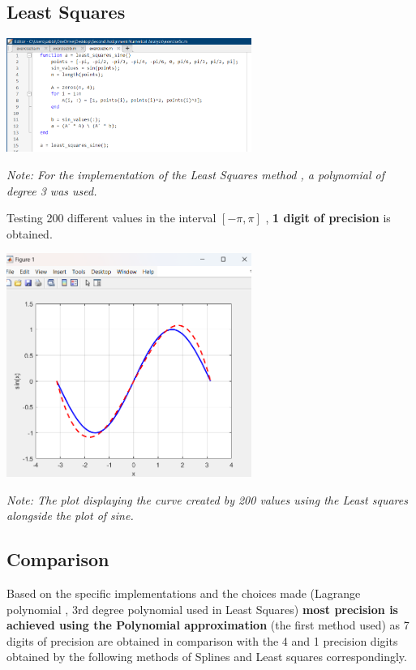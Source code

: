 \documentclass{article}
\begin{document}
\subsection{Least Squares}
\begin{tcolorbox}[colback=red!10, colframe=gray!80, width=\textwidth, sharp corners]
    \centering 
    \includegraphics[width=0.6\textwidth,height=0.19\textheight]{Exercise5cCode.png} 

    
    \vspace{0.5cm}
    \small\textit{Note: For the implementation of the Least Squares method , a polynomial of degree 3 was used.}
\end{tcolorbox}

Testing 200 different values in the interval $ [-\pi,\pi]$ ,\textbf{ 1 digit of precision} is obtained.

\begin{tcolorbox}[colback=red!10, colframe=gray!80, width=\textwidth, sharp corners]
    \centering 
    \includegraphics[width=0.6\textwidth,height=0.19\textheight]{Exercise5cPlot.png} 

    
    \vspace{0.5cm}
    \small\textit{Note: The plot displaying the curve created by 200 values using the Least squares alongside the plot of sine. }
\end{tcolorbox}
\subsection{Comparison}
Based on the specific implementations and the choices made (Lagrange polynomial , 3rd degree polynomial used in Least Squares)\textbf{ most precision is achieved using the Polynomial approximation} (the first method used) as 7 digits of precision are obtained in comparison with the 4 and 1 precision digits obtained by the following methods of Splines and Least squares correspondingly.
\end{document}
